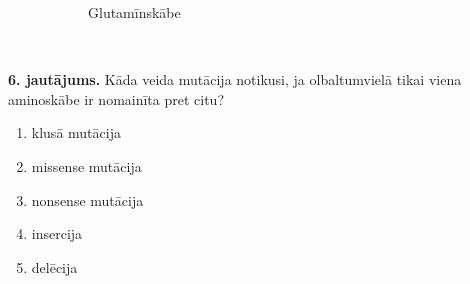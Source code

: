 \documentclass[12pt,a4paper]{article}
\begin{document}
\begin{figure}[h]
\begin{minipage}[c]{0.40\textwidth}
\begin{subfigure}[c]{0.48\textwidth}
            \caption{Glutamīnskābe}
            \label{fig:glutamins}
        \end{subfigure}
        \caption{~}
        \label{fig:valins_glutamins}
    \end{minipage}
\end{figure}


\noindent \textbf{6. jautājums.} Kāda veida mutācija notikusi, ja olbaltumvielā tikai viena aminoskābe ir nomainīta pret citu?

\begin{enumerate}[label=\Alph*.]
    \item klusā mutācija
    \item missense mutācija
    \item nonsense mutācija
    \item insercija
    \item delēcija
\end{enumerate}
\end{document}
